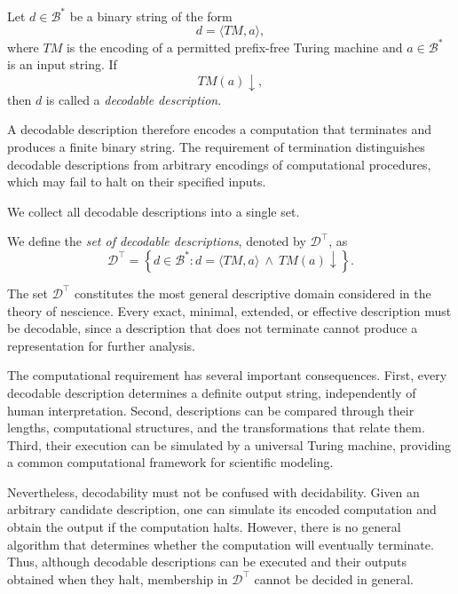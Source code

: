 \begin{definition}
\label{def:description_model}
Let $d\in\mathcal{B}^\ast$ be a binary string of the form
\[
d=\langle TM,a\rangle,
\]
where $TM$ is the encoding of a permitted prefix-free Turing machine and $a\in\mathcal{B}^\ast$ is an input string. If
\[
TM(a)\downarrow,
\]
then $d$ is called a \emph{decodable description}.
\end{definition}

A decodable description therefore encodes a computation that terminates and produces a finite binary string. The requirement of termination distinguishes decodable descriptions from arbitrary encodings of computational procedures, which may fail to halt on their specified inputs.

We collect all decodable descriptions into a single set.

\begin{definition}
\label{def:set_of_descriptions}
We define the \emph{set of decodable descriptions}, denoted by $\mathcal{D}^\top$, as
\[
\mathcal{D}^\top = \left\{d\in\mathcal{B}^\ast:d=\langle TM,a\rangle
\ \wedge\
TM(a)\downarrow\right\}.
\]
\end{definition}

The set $\mathcal{D}^\top$ constitutes the most general descriptive domain considered in the theory of nescience. Every exact, minimal, extended, or effective description must be decodable, since a description that does not terminate cannot produce a representation for further analysis.

The computational requirement has several important consequences. First, every decodable description determines a definite output string, independently of human interpretation. Second, descriptions can be compared through their lengths, computational structures, and the transformations that relate them. Third, their execution can be simulated by a universal Turing machine, providing a common computational framework for scientific modeling.

Nevertheless, decodability must not be confused with decidability. Given an arbitrary candidate description, one can simulate its encoded computation and obtain the output if the computation halts. However, there is no general algorithm that determines whether the computation will eventually terminate. Thus, although decodable descriptions can be executed and their outputs obtained when they halt, membership in $\mathcal{D}^\top$ cannot be decided in general.

